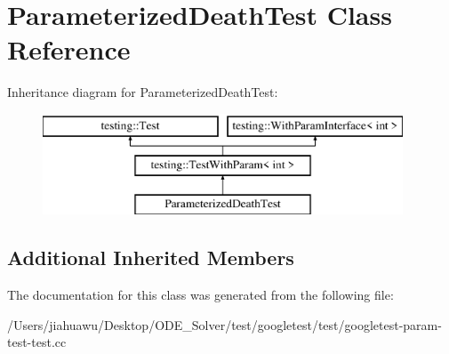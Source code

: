\hypertarget{class_parameterized_death_test}{}\section{Parameterized\+Death\+Test Class Reference}
\label{class_parameterized_death_test}
Inheritance diagram for Parameterized\+Death\+Test\+:\begin{figure}[H]
\begin{center}
\leavevmode
\includegraphics[height=3.000000cm]{class_parameterized_death_test}
\end{center}
\end{figure}
\subsection*{Additional Inherited Members}


The documentation for this class was generated from the following file\+:\begin{DoxyCompactItemize}
\item 
/\+Users/jiahuawu/\+Desktop/\+O\+D\+E\+\_\+\+Solver/test/googletest/test/googletest-\/param-\/test-\/test.\+cc\end{DoxyCompactItemize}
